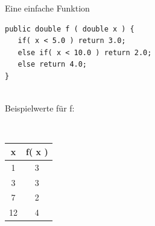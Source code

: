 \begin{frame}[t,fragile]{Eine einfache Funktion} %
\begin{lstlisting}
public double f ( double x ) {
   if( x < 5.0 ) return 3.0;
   else if( x < 10.0 ) return 2.0;
   else return 4.0;
}
\end{lstlisting}

\begin{minipage}[t]{3.5cm}
~ \\
Beispielwerte für f:

~ \\
\begin{tabular}{|c|c|}
\textbf{x} & \textbf{f( x )}  \\ \hline
1 & 3  \\
3 & 3  \\
7 & 2  \\
12 & 4
\end{tabular} 
\end{minipage} 
\hfill
\begin{minipage}[t]{4.5cm}
~ \\
\vspace{-1em}\\

\end{minipage}
\end{frame}

